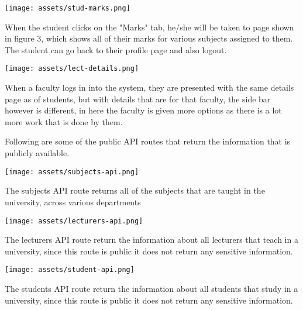 \begin{center}
    \texttt{[image: assets/stud-marks.png]}
\end{center}

When the student clicks on the "Marks" tab, he/she will be taken to page shown
in figure 3, which shows all of their marks for various subjects assigned to
them. The student can go back to their profile page and also logout.

\begin{center}
    \texttt{[image: assets/lect-details.png]}
\end{center}

When a faculty logs in into the system, they are presented with the same details
page as of students, but with details that are for that faculty, the side bar
however is different, in here the faculty is given more options as there is a
lot more work that is done by them.

Following are some of the public API routes that return the information that is
publicly available.

\begin{center}
    \texttt{[image: assets/subjects-api.png]}
\end{center}

The subjects API route returns all of the subjects that are taught in the
university, across various departments

\begin{center}
    \texttt{[image: assets/lecturers-api.png]}
\end{center}

The lecturers API route return the information about all lecturers that teach
in a university, since this route is public it does not return any sensitive
information.

\begin{center}
    \texttt{[image: assets/student-api.png]}
\end{center}

The students API route return the information about all students that study
in a university, since this route is public it does not return any sensitive
information.
